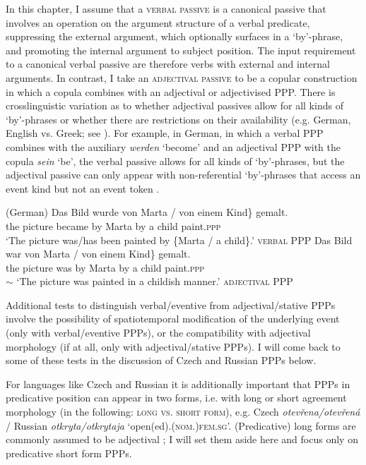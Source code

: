 \documentclass[output=paper,colorlinks,citecolor=brown]{langscibook}
\begin{document}
In this chapter, I assume that a \textsc{verbal passive} is a canonical passive that involves an operation on the argument structure of a verbal predicate, suppressing the external argument, which optionally surfaces in a `by'-phrase, and promoting the internal argument to subject position. The input requirement to a canonical verbal passive are therefore verbs with external and internal arguments. In contrast, I take an \textsc{adjectival passive} to be a copular construction in which a copula combines with an adjectival or adjectivised PPP. There is crosslinguistic variation as to whether adjectival passives allow for all kinds of `by'-phrases or whether there are restrictions on their availability (e.g. German, English vs. Greek; see \citealt{alexiadou+lingua}). For example, in German, in which a verbal PPP combines with the auxiliary \textit{werden} `become' and an adjectival PPP with the copula \textit{sein} `be', the verbal passive allows for all kinds of `by'-phrases, but the adjectival passive can only appear with non-referential `by'-phrases that access an event kind but not an event token  \citep[following][]{gehrkenllt}.

\ea\label{ex:germadjverb} (German)
\ea
\gll Das Bild wurde \minsp{\{} von Marta / von einem Kind\} gemalt.\\
	the picture became {} by Marta {} by a child paint.\textsc{ppp}\\
\glt	`The picture was/has been painted by \{Marta / a child\}.' \hfill \textsc{verbal PPP}
\ex
\gll Das Bild war \minsp{\{\#} von Marta / von einem Kind\} gemalt.\\
	the picture was {} by Marta {} by a child paint.\textsc{ppp}\\
\glt	$\sim$ `The picture was painted in a childish manner.' \hfill \textsc{adjectival PPP}	
\z 
\z

\noindent Additional tests to distinguish verbal/eventive from adjectival/stative PPPs involve the possibility of spatiotemporal modification of the underlying event (only with verbal/eventive PPPs), or the compatibility with adjectival morphology (if at all, only with adjectival/stative PPPs). I will come back to some of these tests in the discussion of Czech and Russian PPPs below. 

For languages like Czech and Russian it is additionally important that PPPs in predicative position can appear in two forms, i.e. with long or short agreement morphology (in the following: \textsc{long vs. short form}), e.g. Czech \textit{otevřena/otevře\-ná} / Russian \textit{otkryta/otkrytaja} `open(ed).\textsc{(nom.)fem.sg}'. (Predicative) long forms are commonly assumed to be adjectival \citep[e.g.][]{veselovskakarlik, borik13}; I will set them aside here and focus only on predicative short form PPPs.
\end{document}
